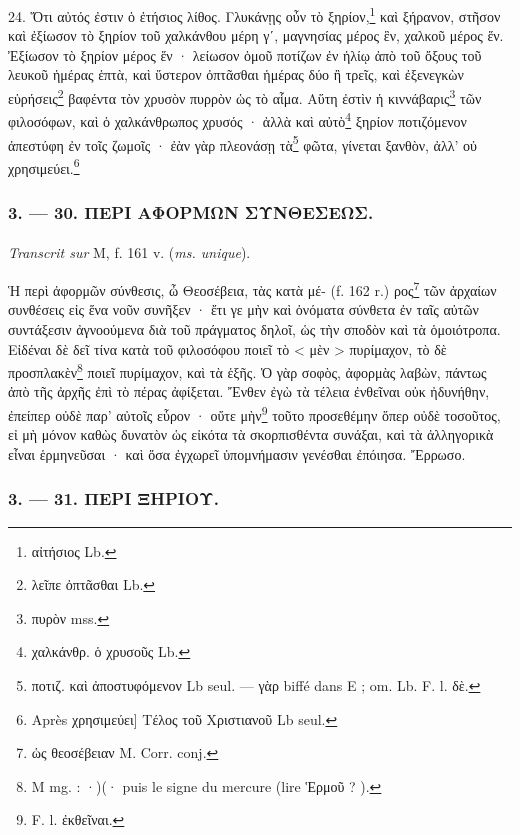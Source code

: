 \documentclass[landscape, a4paper, 11pt, oneside, polutonikogreek, french]{article}
\begin{document}
24. Ὅτι αὐτός ἐστιν ὁ ἐτήσιος λίθος. Γλυκάνῃς οὖν τὸ ξηρίον,\footnote{αἰτήσιος Lb.} καὶ ξήρανον, στῆσον καὶ ἐξίωσον τὸ ξηρίον τοῦ χαλκάνθου μέρη γʹ, μαγνησίας μέρος ἓν, χαλκοῦ μέρος ἕν. Ἐξίωσον τὸ ξηρίον μέρος ἕν · λείωσον ὁμοῦ ποτίζων ἐν ἡλίῳ ἀπὸ τοῦ ὄξους τοῦ λευκοῦ ἡμέρας ἑπτὰ, καὶ ὕστερον ὀπτᾶσθαι ἡμέρας δύο ἢ τρεῖς, καὶ ἐξενεγκὼν εὑρήσεις\footnote{λεῖπε ὀπτᾶσθαι Lb.} βαφέντα τὸν χρυσὸν πυρρὸν ὡς τὸ αἷμα. Αὕτη ἐστὶν ἡ κιννάβαρις\footnote{πυρὸν mss.} τῶν φιλοσόφων, καὶ ὁ χαλκάνθρωπος χρυσός · ἀλλὰ καὶ αὐτὸ\footnote{χαλκάνθρ. ὁ χρυσοῦς Lb.} ξηρίον ποτιζόμενον ἀπεστύφη ἐν τοῖς ζωμοῖς · ἐὰν γὰρ πλεονάσῃ τὰ\footnote{ποτιζ. καὶ ἀποστυφόμενον Lb seul. --- γὰρ biffé dans E ; om. Lb. F. l. δὲ.} φῶτα, γίνεται ξανθὸν, ἀλλ' οὐ χρησιμεύει.\footnote{Après χρησιμεύει] Τέλος τοῦ Χριστιανοῦ Lb seul.}

\bigskip
\centerline{\EightStarTaper}
\centerline{\EightStarTaper\EightStarTaper}
\bigskip

\subsubsection{3. --- 30. ΠΕΡΙ ΑΦΟΡΜΩΝ ΣΥΝΘΕΣΕΩΣ.}
\paragraph{}
\emph{Transcrit sur} M, f. 161 v. (\emph{ms. unique}).

\bigskip

Ἡ περὶ ἀφορμῶν σύνθεσις, ὦ Θεοσέβεια, τὰς κατὰ μέ- (f. 162 r.) ρος\footnote{ὡς θεοσέβειαν M. Corr. conj.} τῶν ἀρχαίων συνθέσεις εἰς ἕνα νοῦν συνῆξεν · ἔτι γε μὴν καὶ ὀνόματα σύνθετα ἐν ταῖς αὐτῶν συντάξεσιν ἀγνοούμενα διὰ τοῦ πράγματος δηλοῖ, ὡς τὴν σποδὸν καὶ τὰ ὁμοιότροπα. Εἰδέναι δὲ δεῖ τίνα κατὰ τοῦ φιλοσόφου ποιεῖ τὸ < μὲν > πυρίμαχον, τὸ δὲ προσπλακὲν\footnote{M mg. : ·)(· puis le signe du mercure (lire Ἑρμοῦ ? ).} ποιεῖ πυρίμαχον, καὶ τὰ ἑξῆς. Ὁ γὰρ σοφὸς, ἀφορμὰς λαβὼν, πάντως ἀπὸ τῆς ἀρχῆς ἐπὶ τὸ πέρας ἀφίξεται. Ἔνθεν ἐγὼ τὰ τέλεια ἐνθεῖναι οὐκ ἠδυνήθην, ἐπείπερ οὐδὲ παρ' αὐτοῖς εὗρον · οὔτε μὴν\footnote{F. l. ἐκθεῖναι.} τοῦτο προσεθέμην ὅπερ οὐδὲ τοσοῦτος, εἰ μὴ μόνον καθὼς δυνατὸν ὡς εἰκότα τὰ σκορπισθέντα συνάξαι, καὶ τὰ ἀλληγορικὰ εἶναι ἑρμηνεῦσαι · καὶ ὅσα ἐγχωρεῖ ὑπομνήμασιν γενέσθαι ἐπόιησα. Ἔρρωσο.

\bigskip
\centerline{\EightStarTaper}
\centerline{\EightStarTaper\EightStarTaper}
\bigskip

\subsubsection{3. --- 31. ΠΕΡΙ ΞΗΡΙΟΥ.}
\end{document}
